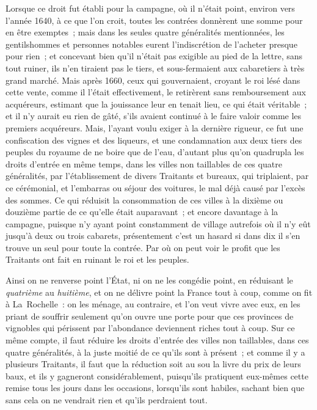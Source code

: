 \documentclass[french,twoside]{book} %
\begin{document}
Lorsque ce droit fut établi pour la campagne, où il n’était point, environ vers l’année 1640, à ce que l’on croit, toutes les contrées donnèrent une somme pour en être exemptes ; mais dans les seules quatre généralités mentionnées, les gentilshommes et personnes notables eurent l’indiscrétion de l’acheter presque pour rien ; et concevant bien qu’il n’était pas exigible au pied de la lettre, sans tout ruiner, ils n’en tiraient pas le tiers, et sous-fermaient aux cabaretiers à très grand marché. Mais après 1660, ceux qui gouvernaient, croyant le roi lésé dans cette vente, comme il l’était effectivement, le retirèrent sans remboursement aux acquéreurs, estimant que la jouissance leur en tenait lieu, ce qui était véritable ; et il n’y aurait eu rien de gâté, s’ils avaient continué à le faire valoir comme les premiers acquéreurs. Mais, l’ayant voulu exiger à la dernière rigueur, ce fut une confiscation des vignes et des liqueurs, et une condamnation aux deux tiers des peuples du royaume de ne boire que de l’eau, d’autant plus qu’on quadrupla les droits d’entrée en même temps, dans les villes non taillables de ces quatre généralités, par l’établissement de divers Traitants et bureaux, qui triplaient, par ce cérémonial, et l’embarras ou séjour des voitures, le mal déjà causé par l’excès des sommes. Ce qui réduisit la consommation de ces villes à la dixième ou douzième partie de ce qu’elle était auparavant ; et encore davantage à la campagne, puisque n’y ayant point constamment de village autrefois où il n’y eût jusqu’à deux ou trois cabarets, présentement c’est un hasard si dans dix il s’en trouve un seul pour toute la contrée. Par où on peut voir le profit que les Traitants ont fait en ruinant le roi et les peuples.\par
Ainsi on ne renverse point l’État, ni on ne les congédie point, en réduisant le {\itshape quatrième} au {\itshape huitième}, et on ne délivre point la France tout à coup, comme on fit à La Rochelle : on les ménage, au contraire, et l’on veut vivre avec eux, en les priant de souffrir seulement qu’on ouvre une porte pour que ces provinces de vignobles qui périssent par l’abondance deviennent riches tout à coup. Sur ce même compte, il faut réduire les droits d’entrée des villes non taillables, dans ces quatre généralités, à la juste moitié de ce qu’ils sont à présent ; et comme il y a plusieurs Traitants, il faut que la réduction soit au sou la livre du prix de leurs baux, et ils y gagneront considérablement, puisqu’ils pratiquent eux-mêmes cette remise tous les jours dans les occasions, lorsqu’ils sont habiles, sachant bien que sans cela on ne vendrait rien et qu’ils perdraient tout.\par
\end{document}
